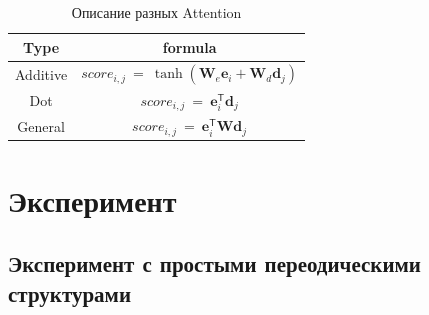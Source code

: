 \documentclass[11pt, a4paper]{article}
\begin{document}
\begin{table}[h!]
\begin{center}
\caption{Описание разных Attention}
\label{tab1}
\begin{tabular}{|c|c|}
\hline
	Type & formula\\
	\hline
	Additive& $score_{i,j}~=~\tanh\left(\textbf{W}_e\textbf{e}_i+\textbf{W}_d\textbf{d}_j\right)$\\
	\hline
	Dot& $score_{i,j}~=~\textbf{e}_i^{\mathsf{T}}\textbf{d}_j$\\
	\hline
	General& $score_{i,j}~=~\textbf{e}_i^{\mathsf{T}}\textbf{W}\textbf{d}_j$\\
\hline
\end{tabular}

\end{center}
\end{table}

\section{Эксперимент}
\subsection{Эксперимент с простыми переодическими структурами}
\end{document}
